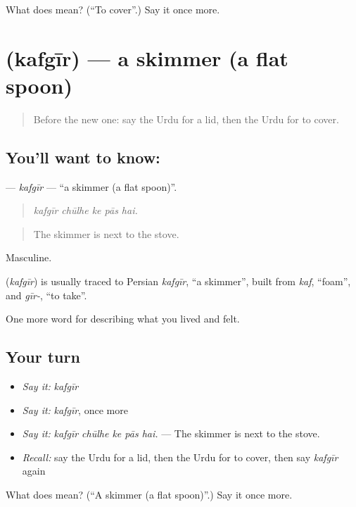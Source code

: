 \begin{tcolorbox}[breakable,colback=teal!4,colframe=teal!35!black,title={Before you move on}]
What does  mean? (\textquotedblleft{}To cover\textquotedblright{}.) Say it once more.
\end{tcolorbox}
\section[\texorpdfstring{\ur{کفگیر} (kafgīr)}{کفگیر (kafgīr)}]{ (kafgīr) — a skimmer (a flat spoon)}

\label{lesson:UR-C508-kafgir}



\begin{quote}
Before the new one: say the Urdu for a lid, then the Urdu for to cover.
\end{quote}

\subsection*{You'll want to know: }
\textbf{} — \emph{kafgīr} — \textquotedblleft{}a skimmer (a flat spoon)\textquotedblright{}.

\begin{quote}
    
\end{quote}

\begin{quote}
\emph{kafgīr chūlhe ke pās hai.}
\end{quote}

\begin{quote}
The skimmer is next to the stove.
\end{quote}

Masculine.

\begin{cousinweb}
\textbf{} (\emph{kafgīr}) is usually traced to Persian \emph{kafgīr}, \textquotedblleft{}a skimmer\textquotedblright{}, built from \emph{kaf}, \textquotedblleft{}foam\textquotedblright{}, and \emph{gīr-}, \textquotedblleft{}to take\textquotedblright{}.
\end{cousinweb}

\begin{grammarlens}[title={What you've built}]
One more word for describing what you lived and felt.
\end{grammarlens}

\subsection*{Your turn}
\begin{itemize}
\raggedright
  \item \emph{Say it:} \emph{kafgīr}
  \item \emph{Say it:} \emph{kafgīr}, once more
  \item \emph{Say it:} \emph{kafgīr chūlhe ke pās hai.} — The skimmer is next to the stove.
  \item \emph{Recall:} say the Urdu for a lid, then the Urdu for to cover, then say \emph{kafgīr} again
\end{itemize}

\begin{tcolorbox}[breakable,colback=teal!4,colframe=teal!35!black,title={Before you move on}]
What does  mean? (\textquotedblleft{}A skimmer (a flat spoon)\textquotedblright{}.) Say it once more.
\end{tcolorbox}
